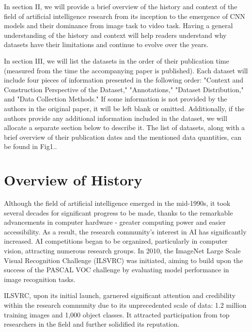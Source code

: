 \documentclass[10pt,onecolumn,letterpaper]{article}
\begin{document}
In section II, we will provide a brief overview of the history and context of
the field of artificial intelligence research from its inception to the
emergence of CNN models and their dominance from image task to video task.
Having a general understanding of the history and context will help readers
understand why datasets have their limitations and continue to evolve over the
years.

In section III, we will list the datasets in the order of their publication time
(measured from the time the accompanying paper is published). Each dataset will
include four pieces of information presented in the following order: "Context
and Construction Perspective of the Dataset," "Annotations," "Dataset
Distribution," and "Data Collection Methods." If some information is not
provided by the authors in the original paper, it will be left blank or omitted.
Additionally, if the authors provide any additional information included in the
dataset, we will allocate a separate section below to describe it. The list of
datasets, along with a brief overview of their publication dates and the
mentioned data quantities, can be found in Fig1..

\section{Overview of History}

Although the field of artificial intelligence emerged in the mid-1990s, it took
several decades for significant progress to be made, thanks to the remarkable
advancements in computer hardware - greater computing power and easier
accessibility. As a result, the research community's interest in AI has
significantly increased. AI competitions began to be organized, particularly in
computer vision, attracting numerous research groups. In 2010, the ImageNet
Large Scale Visual Recognition Challenge (ILSVRC) \cite{ILSVRC} was initiated,
aiming to build upon the success of the PASCAL VOC challenge \cite{PASCALVOC} by
evaluating model performance in image recognition tasks.

ILSVRC, upon its initial launch, garnered significant attention and credibility
within the research community due to its unprecedented scale of data: 1.2
million training images and 1,000 object classes. It attracted participation
from top researchers in the field and further solidified its reputation.
\end{document}

